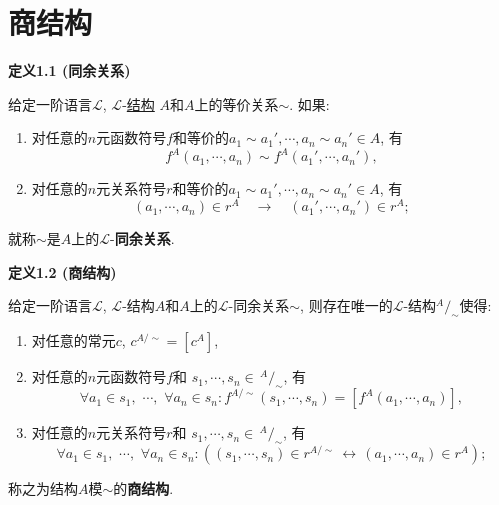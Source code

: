 \documentclass[UTF8]{ctexart}
\begin{document}
\setlength{\abovedisplayskip}{1pt}
\setlength{\belowdisplayskip}{1pt}

\section{商结构}

\hypertarget{sec:定义1.1}{}
\noindent\textbf{定义1.1 (同余关系)}

给定一阶语言$\mathcal{L}$,
$\mathcal{L}$-\href{01 一阶语言的结构#nameddest=sec:定义1.1}{结构}
$A$和$A$上的等价关系$\sim$. 如果:
\begin{enumerate}
    \item 对任意的$n$元函数符号$f$和等价的$a_1\sim a_1',\cdots,a_n\sim a_n'\in A$, 有
    \[
        f^A(a_1,\cdots,a_n)\sim f^A(a_1',\cdots,a_n'),
    \]
    \item 对任意的$n$元关系符号$r$和等价的$a_1\sim a_1',\cdots,a_n\sim a_n'\in A$, 有
    \[
        (a_1,\cdots,a_n)\in r^A\quad\to\quad(a_1',\cdots,a_n')\in r^A;
    \]
\end{enumerate}
就称$\sim$是$A$上的$\mathcal{L}$-\textbf{同余关系}.

\vspace{10pt}

\hypertarget{sec:定义1.2}{}
\noindent\textbf{定义1.2 (商结构)}

给定一阶语言$\mathcal{L}$, $\mathcal{L}$-结构$A$和$A$上的$\mathcal{L}$-同余关系$\sim$,
则存在唯一的$\mathcal{L}$-结构$^{\displaystyle A}\!/_{\displaystyle\sim}$使得:
\begin{enumerate}
    \item 对任意的常元$c$, $c^{A/\sim}=[c^A]$,
    \item 对任意的$n$元函数符号$f$和
    $s_1,\cdots,s_n\in\,\!^{\displaystyle A}\!/_{\displaystyle\sim}$, 有
    \[
        \forall a_1\in s_1,\,\,\cdots,\,\,\forall a_n\in s_n:
        f^{A/\sim}(s_1,\cdots,s_n)=[f^A(a_1,\cdots,a_n)],
    \]
    \vspace{-13pt}
    \item 对任意的$n$元关系符号$r$和
    $s_1,\cdots,s_n\in\,\!^{\displaystyle A}\!/_{\displaystyle\sim}$, 有
    \[
        \forall a_1\in s_1,\,\,\cdots,\,\,\forall a_n\in s_n:
        ((s_1,\cdots,s_n)\in r^{A/\sim}\,\leftrightarrow\,(a_1,\cdots,a_n)\in r^A);
    \]
\end{enumerate}
称之为结构$A$模$\sim$的\textbf{商结构}.


\end{document}
